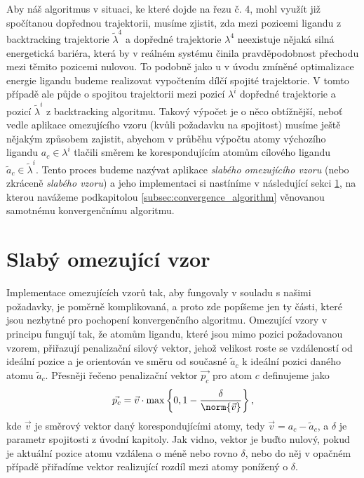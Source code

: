 Aby náš algoritmus v situaci, ke které dojde na řezu č. 4, mohl využít již spočítanou
dopřednou trajektorii, musíme zjistit, zda mezi pozicemi ligandu z backtracking trajektorie
$ \tilde{\lambda}^4 $ a dopředné trajektorie $ \lambda^4 $ neexistuje nějaká silná
energetická bariéra, která by v reálném systému činila pravděpodobnost přechodu
mezi těmito pozicemi nulovou. To podobně jako u v úvodu zmíněné optimalizace
energie ligandu budeme realizovat vypočtením dílčí spojité trajektorie.
V tomto případě ale půjde o spojitou trajektorii mezi pozicí $ \lambda^i $ dopředné
trajektorie a pozicí $ \tilde{\lambda}^i $ z backtracking algoritmu. Takový
výpočet je o něco obtížnější, neboť vedle aplikace omezujícího vzoru (kvůli
požadavku na spojitost) musíme ještě nějakým způsobem zajistit, abychom v průběhu
výpočtu atomy výchozího ligandu $ a_c \in \lambda^i $ tlačili
směrem ke korespondujícím atomům cílového ligandu $ \tilde{a}_c \in \tilde{\lambda}^i $.
Tento proces budeme nazývat aplikace \textit{slabého omezujícího vzoru} (nebo
zkráceně \textit{slabého vzoru}) a jeho implementaci si nastíníme v následující
sekci \ref{subsec:weak_pattern}, na kterou navážeme podkapitolou
\ref{subsec:convergence_algorithm} věnovanou samotnému konvergenčnímu algoritmu.




\section{Slabý omezující vzor} \label{subsec:weak_pattern}
Implementace omezujících vzorů tak, aby fungovaly v souladu s našimi požadavky,
je poměrně komplikovaná, a proto zde popíšeme jen ty části, které jsou nezbytné
pro pochopení konvergenčního algoritmu. Omezující vzory v principu fungují tak,
že atomům ligandu, které jsou mimo pozici požadovanou vzorem, přiřazují
penalizační silový vektor, jehož velikost roste se vzdáleností od ideální pozice
a je orientován ve směru od současné $ \tilde{a}_c $ k ideální pozici daného
atomu $ \tilde{a}_c $. Přesněji řečeno penalizační vektor $ \vec{p_c} $ pro
atom $ c $ definujeme jako
\begin{align*}
    \vec{p_c} = \vec{v} \cdot \max\left\{ 0, 1 - \frac{\delta}{\norm{\vec{v}}} \right\},
\end{align*}
kde $ \vec{v} $ je směrový vektor daný korespondujícími atomy, tedy
$ \vec{v} = a_c - \tilde{a}_c $, a $ \delta $ je parametr spojitosti z úvodní
kapitoly. Jak vidno, vektor je buďto nulový, pokud je aktuální pozice atomu vzdálena
o méně nebo rovno $ \delta $, nebo do něj v opačném případě přiřadíme vektor
realizující rozdíl mezi atomy ponížený o $ \delta $.

